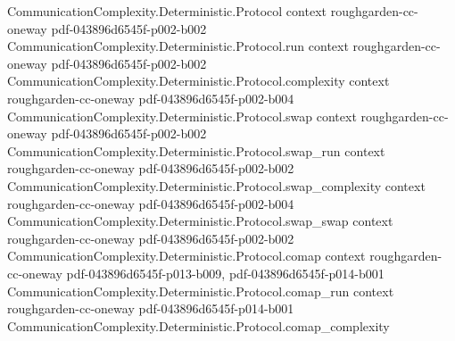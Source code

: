 \begin{theorem}
\label{CommunicationComplexity.PublicCoin.OneWay.lt_communicationComplexity_of_forall_distributionalError_gt}
\leanok
{}
\proofstep
  {CommunicationComplexity.Deterministic.Protocol}
  {context}
  {roughgarden-cc-oneway}
  {pdf-043896d6545f-p002-b002}
\proofstep
  {CommunicationComplexity.Deterministic.Protocol.run}
  {context}
  {roughgarden-cc-oneway}
  {pdf-043896d6545f-p002-b002}
\proofstep
  {CommunicationComplexity.Deterministic.Protocol.complexity}
  {context}
  {roughgarden-cc-oneway}
  {pdf-043896d6545f-p002-b004}
\proofstep
  {CommunicationComplexity.Deterministic.Protocol.swap}
  {context}
  {roughgarden-cc-oneway}
  {pdf-043896d6545f-p002-b002}
\proofstep
  {CommunicationComplexity.Deterministic.Protocol.swap_run}
  {context}
  {roughgarden-cc-oneway}
  {pdf-043896d6545f-p002-b002}
\proofstep
  {CommunicationComplexity.Deterministic.Protocol.swap_complexity}
  {context}
  {roughgarden-cc-oneway}
  {pdf-043896d6545f-p002-b004}
\proofstep
  {CommunicationComplexity.Deterministic.Protocol.swap_swap}
  {context}
  {roughgarden-cc-oneway}
  {pdf-043896d6545f-p002-b002}
\proofstep
  {CommunicationComplexity.Deterministic.Protocol.comap}
  {context}
  {roughgarden-cc-oneway}
  {pdf-043896d6545f-p013-b009,
    pdf-043896d6545f-p014-b001}
\proofstep
  {CommunicationComplexity.Deterministic.Protocol.comap_run}
  {context}
  {roughgarden-cc-oneway}
  {pdf-043896d6545f-p014-b001}
\proofstep
  {CommunicationComplexity.Deterministic.Protocol.comap_complexity}

\end{theorem}
